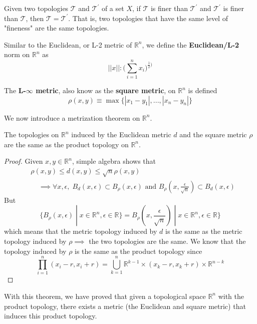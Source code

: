 \documentclass{article}
\begin{document}
  \begin{corollary}
  Given two topologies $\mathscr{T}$ and $\mathscr{T}^\prime$ of a set $X$, if $\mathscr{T}$ is finer than $\mathscr{T}^\prime$ and $\mathscr{T}^\prime$ is finer than $\mathscr{T}$, then $\mathscr{T} = \mathscr{T}^\prime$. That is, two topologies that have the same level of "fineness" are the same topologies. 
  \end{corollary}

  \begin{definition}
  Similar to the Euclidean, or L-2 metric of $\mathbb{R}^n$, we define the \textbf{Euclidean/L-2} norm on $\mathbb{R}^n$ as
  \[||x||: \bigg( \sum_{i=1}^n x_i \bigg)^{\frac{1}{2})}\]
  \end{definition}

  \begin{definition}
  The \textbf{L-$\infty$ metric}, also know as the \textbf{square metric}, on $\mathbb{R}^n$ is defined 
  \[\rho(x, y) \equiv \max{\{|x_1 - y_1|, ..., |x_n - y_n|\}}\]
  \end{definition}

  We now introduce a metrization theorem on $\mathbb{R}^n$. 

  \begin{theorem}
  The topologies on $\mathbb{R}^n$ induced by the Euclidean metric $d$ and the square metric $\rho$ are the same as the product topology on $\mathbb{R}^n$. 
  \end{theorem}
  \begin{proof}
  Given $x, y \in \mathbb{R}^n$, simple algebra shows that 
  \begin{align*}
      & \rho(x, y) \leq d(x, y) \leq \sqrt{n} \rho(x, y) \\
      & \;\;\;\; \implies \forall x, \epsilon, \; B_d (x, \epsilon) \subset B_\rho (x, \epsilon) \text{ and } B_\rho (x, \frac{\epsilon}{\sqrt{n}}) \subset B_d (x, \epsilon)
  \end{align*}
  But
  \[\{ B_\rho (x, \epsilon) \; | \; x \in \mathbb{R}^n, \epsilon \in \mathbb{R}\} = B_\rho (x, \frac{\epsilon}{\sqrt{n}}) \; | \; x \in \mathbb{R}^n, \epsilon \in \mathbb{R}\}\]
  which means that the metric topology induced by $d$ is the same as the metric topology induced by $\rho \implies$ the two topologies are the same. We know that the topology induced by $\rho$ is the same as the product topology since 
  \[\prod_{i=1}^n (x_i - r, x_i + r) = \bigcup_{k=1}^n \mathbb{R}^{k-1} \times (x_k - r, x_k + r) \times \mathbb{R}^{n-k}\]
  \end{proof}
  With this theorem, we have proved that given a topological space $\mathbb{R}^n$ with the product topology, there exists a metric (the Euclidean and square metric) that induces this product topology. 
\end{document}
